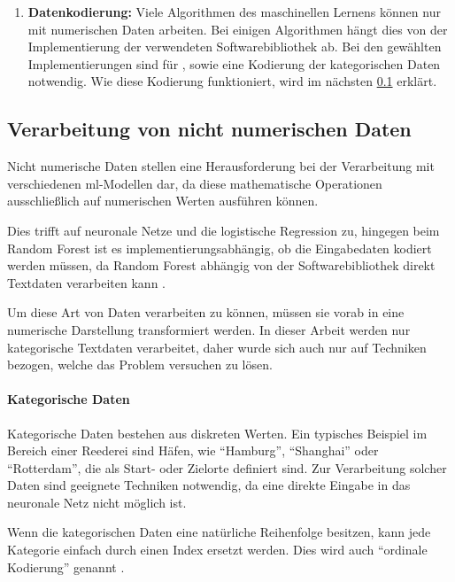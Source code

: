 \begin{enumerate}
    \item \textbf{Datenkodierung:}  
    Viele Algorithmen des maschinellen Lernens können nur mit numerischen Daten arbeiten. 
    Bei einigen Algorithmen hängt dies von der Implementierung der verwendeten Softwarebibliothek ab.
    Bei den gewählten Implementierungen sind für , sowie  eine Kodierung der kategorischen Daten notwendig. Wie diese Kodierung funktioniert, wird im nächsten \cref{ref:feat_encoding} erklärt.

\end{enumerate}



\subsection{Verarbeitung von nicht numerischen Daten}
\label{ref:feat_encoding}

Nicht numerische Daten stellen eine Herausforderung bei der Verarbeitung mit verschiedenen \gls{ml}-Modellen dar, da diese mathematische Operationen ausschließlich auf numerischen Werten ausführen können. 

Dies trifft auf neuronale Netze und die logistische Regression zu, hingegen beim Random Forest ist es implementierungsabhängig, ob die Eingabedaten kodiert werden müssen, da Random Forest abhängig von der Softwarebibliothek direkt Textdaten verarbeiten kann \cite{ydf2024, scikit-learn2024}.

Um diese Art von Daten verarbeiten zu können, müssen sie vorab in eine numerische Darstellung transformiert werden. In dieser Arbeit werden nur kategorische Textdaten verarbeitet, daher wurde sich auch nur auf Techniken bezogen, welche das Problem versuchen zu lösen.

\paragraph{Kategorische Daten}
Kategorische Daten bestehen aus diskreten Werten. Ein typisches Beispiel im Bereich einer Reederei sind Häfen, wie \enquote{Hamburg}, \enquote{Shanghai} oder \enquote{Rotterdam}, die als Start- oder Zielorte definiert sind. Zur Verarbeitung solcher Daten sind geeignete Techniken notwendig, da eine direkte Eingabe in das neuronale Netz nicht möglich ist. 

Wenn die kategorischen Daten eine natürliche Reihenfolge besitzen, kann jede Kategorie einfach durch einen Index ersetzt werden. 
Dies wird auch \enquote{ordinale Kodierung} genannt \cite{reusser2024tabularlearningencodingentity}.

